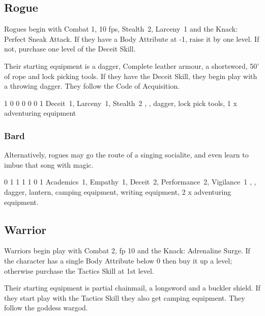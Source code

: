 {\begin{multicols}{2}
\subsection{Rogue}

Rogues begin with Combat 1, 10 \glspl{fp}, Stealth~2, Larceny~1 and the Knack: Perfect Sneak Attack.
If they have a Body Attribute at -1, raise it by one level.
If not, purchase one level of the Deceit Skill.

Their starting equipment is a dagger, Complete leather armour, a shortsword, 50' of rope and lock picking tools.
If they have the Deceit Skill, they begin play with a throwing dagger.
They follow the Code of Acquisition.


{1}%
{0}%
{{0}%
{0}%
{0}}%
{0}%
{1}%
{Deceit~1, Larceny~1, Stealth~2\knacks{\perfectsneakattack}}%
{\longsword, \completeleather, dagger, lock pick tools, 1 x adventuring equipment}%
{\addtocounter{fp}{5}}

\subsubsection{Bard}

Alternatively, rogues may go the route of a singing socialite, and even learn to imbue that song with magic.


{0}%
{1}%
{{1}%
{1}%
{1}}%
{0}%
{1}%
{Academics~1, Empathy~1, Deceit~2, Performance~2, Vigilance~1}%
{\longsword, \partialleather, dagger, lantern, camping equipment, writing equipment, 2 x adventuring equipment.}%
{\addtocounter{fp}{10}}

\subsection{Warrior}

Warriors begin play with Combat 2, \gls{fp} 10 and the Knack: Adrenaline Surge.
If the character has a single Body Attribute below 0 then buy it up a level; otherwise purchase the Tactics Skill at 1st level.

Their starting equipment is partial chainmail, a longsword and a buckler shield.
If they start play with the Tactics Skill they also get camping equipment.
They follow the goddess \gls{wargod}.


\end{multicols}}
